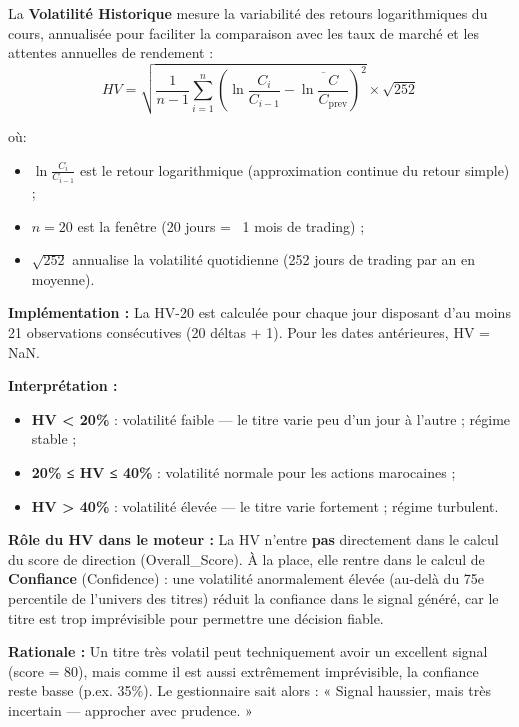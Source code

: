 \documentclass{rapportENSIAS} %
\begin{document}
\vspace{0.2cm}
\noindent
La \textbf{Volatilité Historique} mesure la variabilité des retours logarithmiques du cours, annualisée pour faciliter la comparaison avec les taux de marché et les attentes annuelles de rendement :
\[
HV = \sqrt{\frac{1}{n-1} \sum_{i=1}^{n} \left(\ln\frac{C_i}{C_{i-1}} - \overline{\ln\frac{C}{C_\text{prev}}}\right)^2} \times \sqrt{252}
\]

\noindent
où:
\begin{itemize}
    \item $\ln\frac{C_i}{C_{i-1}}$ est le retour logarithmique (approximation continue du retour simple) ;
    \item $n=20$ est la fenêtre (20 jours = ~1 mois de trading) ;
    \item $\sqrt{252}$ annualise la volatilité quotidienne (252 jours de trading par an en moyenne).
\end{itemize}

\vspace{0.2cm}
\noindent
\textbf{Implémentation :} La HV-20 est calculée pour chaque jour disposant d'au moins 21 observations consécutives (20 déltas + 1). Pour les dates antérieures, HV = NaN.

\vspace{0.2cm}
\noindent
\textbf{Interprétation :}
\begin{itemize}
    \item \textbf{HV < 20\%} : volatilité faible — le titre varie peu d'un jour à l'autre ; régime stable ;
    \item \textbf{20\% ≤ HV ≤ 40\%} : volatilité normale pour les actions marocaines ;
    \item \textbf{HV > 40\%} : volatilité élevée — le titre varie fortement ; régime turbulent.
\end{itemize}

\noindent
\textbf{Rôle du HV dans le moteur :} La HV n'entre \textbf{pas} directement dans le calcul du score de direction (Overall\_Score). À la place, elle rentre dans le calcul de \textbf{Confiance} (Confidence) : une volatilité anormalement élevée (au-delà du 75e percentile de l'univers des titres) réduit la confiance dans le signal généré, car le titre est trop imprévisible pour permettre une décision fiable.

\noindent
\textbf{Rationale :} Un titre très volatil peut techniquement avoir un excellent signal (score = 80), mais comme il est aussi extrêmement imprévisible, la confiance reste basse (p.ex. 35\%). Le gestionnaire sait alors : « Signal haussier, mais très incertain — approcher avec prudence. »
\end{document}
